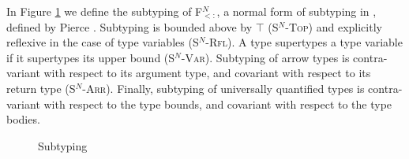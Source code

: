 \documentclass[runningheads, anon]{llncs}
\begin{document}
In Figure \ref{f:fsub:subtyping} we define the subtyping of F$_{<:}^N$, a normal form of subtyping in \Fsub, defined by Pierce \cite{Pierce:1992:BQU:143165.143228}. Subtyping is bounded above by $\top$ (\textsc{S$^N$-Top}) and explicitly reflexive in the case of type variables (\textsc{S$^N$-Rfl}).
A type supertypes a type variable if it supertypes its upper bound (\textsc{S$^N$-Var}).
Subtyping of arrow types is contra-variant with respect to its argument type, and covariant with respect to its return type (\textsc{S$^N$-Arr}).
Finally, subtyping of universally quantified types is contra-variant with respect to the type bounds, and covariant with respect to the type bodies.
\begin{figure}[t]
\caption{\Fsub Subtyping}
\label{f:fsub:subtyping}
\end{figure}
\end{document}
